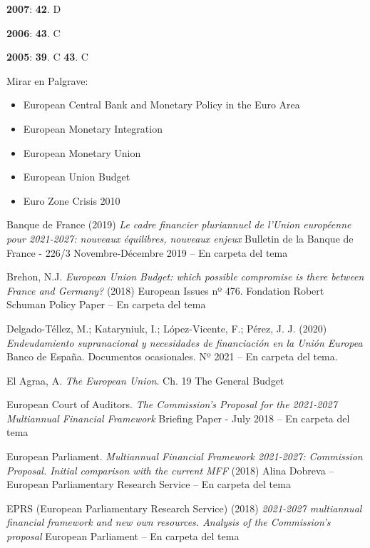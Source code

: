 \documentclass{nuevotema}
\begin{document}
\textbf{2007}: \textbf{42}. D

\textbf{2006}: \textbf{43}. C

\textbf{2005}: \textbf{39}. C \textbf{43}. C

\bibliografia

Mirar en Palgrave:
\begin{itemize}
	\item European Central Bank and Monetary Policy in the Euro Area
	\item European Monetary Integration
	\item European Monetary Union
	\item European Union Budget
	\item Euro Zone Crisis 2010
\end{itemize}

Banque de France (2019) \textit{Le cadre financier pluriannuel de l'Union européenne pour 2021-2027: nouveaux équilibres, nouveaux enjeux} Bulletin de la Banque de France - 226/3 Novembre-Décembre 2019 -- En carpeta del tema

Brehon, N.J. \textit{European Union Budget: which possible compromise is there between France and Germany?} (2018) European Issues nº 476. Fondation Robert Schuman Policy Paper -- En carpeta del tema

Delgado-Téllez, M.; Kataryniuk, I.; López-Vicente, F.; Pérez, J. J. (2020) \textit{Endeudamiento supranacional y necesidades de financiación en la Unión Europea} Banco de España. Documentos ocasionales. Nº 2021 -- En carpeta del tema.

El Agraa, A. \textit{The European Union}. Ch. 19 The General Budget

European Court of Auditors. \textit{The Commission's Proposal for the 2021-2027 Multiannual Financial Framework} Briefing Paper - July 2018 -- En carpeta del tema

European Parliament. \textit{Multiannual Financial Framework 2021-2027: Commission Proposal. Initial comparison with the current MFF} (2018) Alina Dobreva -- European Parliamentary Research Service -- En carpeta del tema

EPRS (European Parliamentary Research Service) (2018) \textit{2021-2027 multiannual financial framework and new own resources. Analysis of the Commission's proposal} European Parliament -- En carpeta del tema
\end{document}

